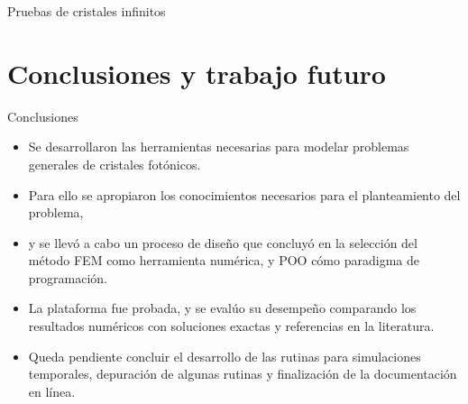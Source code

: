 \documentclass[xcolor=table,serif,handout]{beamer}
\begin{document}
\begin{frame}{Pruebas de cristales infinitos}
{\begin{figure}
	\end{figure}
	}
	\end{frame}
\section{Conclusiones y trabajo futuro}	
	\begin{frame}{Conclusiones}
	
	\begin{itemize}
	\item Se desarrollaron las herramientas necesarias para modelar problemas generales de cristales fotónicos.
	\item Para ello se apropiaron los conocimientos necesarios para el planteamiento del problema, 
	\item y se llevó a cabo un proceso de diseño que concluyó en la selección del método FEM como herramienta numérica, y POO cómo paradigma de programación.
	\item  La plataforma fue probada, y se evalúo su desempeño comparando los resultados numéricos con soluciones exactas y referencias en la literatura.
	\item Queda pendiente concluir el desarrollo de las rutinas para simulaciones temporales, depuración de algunas rutinas y finalización de la documentación en línea.
	\end{itemize}
	\end{frame}
\end{document}
